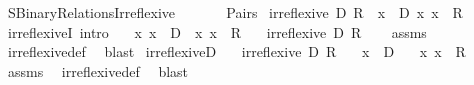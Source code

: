 %
\begin{isabellebody}%
%
%
\isadelimdocument
%
\endisadelimdocument
%
\isatagdocument
%
\isamarkuptrue%
%
\endisatagdocument
{\isafolddocument}%
%
\isadelimdocument
%
\endisadelimdocument
%
\isadelimtheory
%
\endisadelimtheory
%
\isatagtheory
{}\isamarkupfalse%
\ SBinary{\isacharunderscore}{\kern0pt}Relations{\isacharunderscore}{\kern0pt}Irreflexive\isanewline
\ \ \isanewline
\ \ \ \ Pairs\isanewline
{}%
\endisatagtheory
{\isafoldtheory}%
%
\isadelimtheory
\isanewline
%
\endisadelimtheory
\isanewline
{}\isamarkupfalse%
\ {\isachardoublequoteopen}irreflexive\ D\ R\ {\isasymequiv}\ {\isasymforall}x\ {\isasymin}\ D{\isachardot}{\kern0pt}\ {\isasymlangle}x{\isacharcomma}{\kern0pt}\ x{\isasymrangle}\ {\isasymnotin}\ R{\isachardoublequoteclose}\isanewline
\isanewline
{}\isamarkupfalse%
\ irreflexiveI\ {\isacharbrackleft}{\kern0pt}intro{\isacharbrackright}{\kern0pt}{\isacharcolon}{\kern0pt}\isanewline
\ \ \ {\isachardoublequoteopen}{\isasymAnd}x{\isachardot}{\kern0pt}\ x\ {\isasymin}\ D\ {\isasymLongrightarrow}\ {\isasymlangle}x{\isacharcomma}{\kern0pt}\ x{\isasymrangle}\ {\isasymnotin}\ R{\isachardoublequoteclose}\isanewline
\ \ \ {\isachardoublequoteopen}irreflexive\ D\ R{\isachardoublequoteclose}\isanewline
%
\isadelimproof
\ \ %
\endisadelimproof
%
\isatagproof
{}\isamarkupfalse%
\ assms\ \isamarkupfalse%
\ irreflexive{\isacharunderscore}{\kern0pt}def\ \isamarkupfalse%
\ blast%
\endisatagproof
{\isafoldproof}%
%
\isadelimproof
\isanewline
%
\endisadelimproof
\isanewline
{}\isamarkupfalse%
\ irreflexiveD{\isacharcolon}{\kern0pt}\isanewline
\ \ \ {\isachardoublequoteopen}irreflexive\ D\ R{\isachardoublequoteclose}\isanewline
\ \ \ {\isachardoublequoteopen}x\ {\isasymin}\ D{\isachardoublequoteclose}\isanewline
\ \ \ {\isachardoublequoteopen}{\isasymlangle}x{\isacharcomma}{\kern0pt}\ x{\isasymrangle}\ {\isasymnotin}\ R{\isachardoublequoteclose}\isanewline
%
\isadelimproof
\ \ %
\endisadelimproof
%
\isatagproof
{}\isamarkupfalse%
\ assms\ \isamarkupfalse%
\ irreflexive{\isacharunderscore}{\kern0pt}def\ \isamarkupfalse%
\ blast%
\endisatagproof
{\isafoldproof}%
%
\isadelimproof
\isanewline
%
\endisadelimproof
\isanewline
%
\isadelimtheory
\isanewline
%
\endisadelimtheory
%
\isatagtheory
{}\isamarkupfalse%
%
\endisatagtheory
{\isafoldtheory}%
%
\isadelimtheory
%
\endisadelimtheory
%
\end{isabellebody}%
